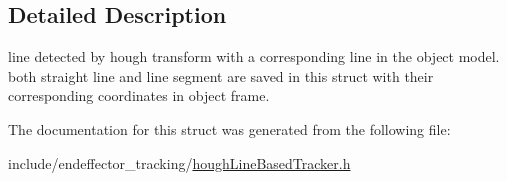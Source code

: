 \subsection{\-Detailed \-Description}
line detected by hough transform with a corresponding line in the object model. both straight line and line segment are saved in this struct with their corresponding coordinates in object frame. 

\-The documentation for this struct was generated from the following file\-:\begin{DoxyCompactItemize}
\item 
include/endeffector\-\_\-tracking/\hyperlink{houghLineBasedTracker_8h}{hough\-Line\-Based\-Tracker.\-h}\end{DoxyCompactItemize}
